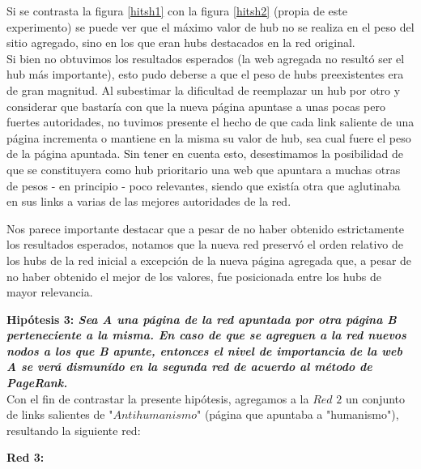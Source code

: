 \documentclass[a4paper]{article}
\begin{document}
Si se contrasta la figura \ref{hitsh1} con la figura \ref{hitsh2} (propia de este experimento) se puede ver que el máximo valor de hub  no se realiza en el peso del sitio agregado, sino en los que eran hubs destacados en la red original. \\
Si bien no obtuvimos los resultados esperados (la web agregada no resultó ser el hub más importante), esto pudo deberse a que el peso de hubs preexistentes era de gran magnitud. Al subestimar la dificultad de reemplazar un hub por otro y considerar que bastaría con que la nueva página apuntase a unas pocas pero fuertes autoridades, no tuvimos presente el hecho de que cada link saliente de una página incrementa o mantiene en la misma su valor de hub, sea cual fuere el peso de la página apuntada. Sin tener en cuenta esto, desestimamos la posibilidad de que se constituyera como hub prioritario una web que apuntara a muchas otras de pesos - en principio - poco relevantes, siendo que existía otra que aglutinaba en sus links a varias de las mejores autoridades de la red.

Nos parece importante destacar que a pesar de no haber obtenido estrictamente los resultados esperados, notamos que la nueva red preservó el orden relativo de los hubs de la red inicial a excepción de la nueva página agregada que, a pesar de no haber obtenido el mejor de los valores, fue posicionada entre los hubs de mayor relevancia.\\


\newpage

\textbf{Hipótesis 3: \itshape{Sea A una página de la red apuntada por otra página B perteneciente a la misma. En caso de que se agreguen a la red nuevos nodos a los que B apunte, entonces el nivel de importancia de la web A se verá dismunído en la segunda red de acuerdo al método de PageRank.}}\\

Con el fin de contrastar la presente hipótesis, agregamos a la $Red$ $2$ un conjunto de links salientes de "$Antihumanismo$" (página que apuntaba a "humanismo"), resultando la siguiente red:

\textbf{Red 3:}\\
\end{document}
